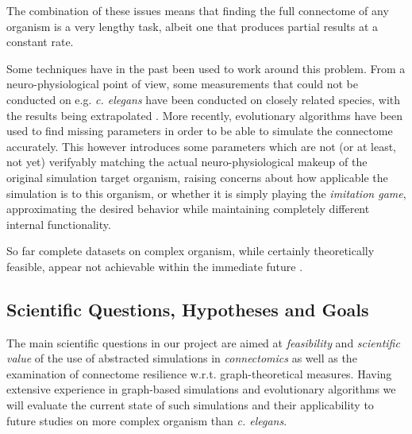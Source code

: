 \documentclass[a4paper,11pt]{article}
\begin{document}
The combination of these issues means that finding the full connectome of any organism is a very lengthy task, albeit one that produces partial results at a constant rate. 

Some techniques have in the past been used to work around this problem. From a neuro-physiological point of view, some measurements that could not be conducted on e.g. \emph{c. elegans} have been conducted on closely related species, with the results being extrapolated \citep{ThatBlueBook}. More recently, evolutionary algorithms have been used to find missing parameters in order to be able to simulate the connectome accurately. This however introduces some parameters which are not (or at least, not yet) verifyably matching the actual neuro-physiological makeup of the original simulation target organism, raising concerns about how applicable the simulation is to this organism, or whether it is simply playing the \emph{imitation game}, approximating the desired behavior while maintaining completely different internal functionality.

So far complete datasets on complex organism, while certainly theoretically feasible, appear not achievable within the immediate future \citep{Gjorgjieva2014} \citep{Mikula2016}.


\subsection{Scientific Questions, Hypotheses and Goals}

The main scientific questions in our project are aimed at \emph{feasibility} and \emph{scientific value} of the use of abstracted simulations in \emph {connectomics} as well as the examination of connectome resilience w.r.t. graph-theoretical measures. Having extensive experience in graph-based simulations and evolutionary algorithms we will evaluate the current state of such simulations and their applicability to future studies on more complex organism than \emph{c. elegans}.
\end{document}
